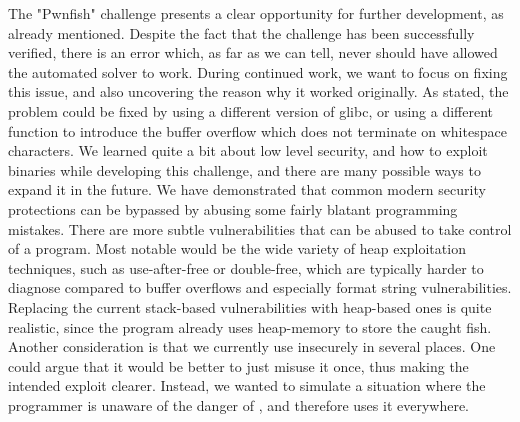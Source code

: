 The "Pwnfish" challenge presents a clear opportunity for further development, as already mentioned. Despite the fact that the challenge has been successfully verified, there is an error which, as far as we can tell, never should have allowed the automated solver to work. During continued work, we want to focus on fixing this issue, and also uncovering the reason why it worked originally. As stated, the problem could be fixed by using a different version of glibc, or using a different function to introduce the buffer overflow which does not terminate on whitespace characters. We learned quite a bit about low level security, and how to exploit binaries while developing this challenge, and there are many possible ways to expand it in the future. We have demonstrated that common modern security protections can be bypassed by abusing some fairly blatant programming mistakes. There are more subtle vulnerabilities that can be abused to take control of a program. Most notable would be the wide variety of heap exploitation techniques, such as use-after-free or double-free, which are typically harder to diagnose compared to buffer overflows and especially format string vulnerabilities. Replacing the current stack-based vulnerabilities with heap-based ones is quite realistic, since the program already uses heap-memory to store the caught fish.
Another consideration is that we currently use  insecurely in several places. One could argue that it would be better to just misuse it once, thus making the intended exploit clearer. Instead, we wanted to simulate a situation where the programmer is unaware of the danger of , and therefore uses it everywhere.




